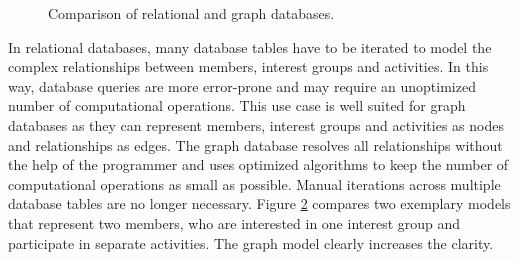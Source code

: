 \documentclass[12pt,numbers=noenddot,parskip,bibliography=totocnumbered,listof=totocnumbered,draft]{scrreprt}
\begin{document}
\begin{figure}
\bigskip

\begin{subfigure}[b]{\textwidth}%
\centering
{}
\caption{}
\label{graph database}
\end{subfigure}%
\caption[Comparison of relational and graph databases]{Comparison of relational and graph databases.}
\label{databases}
\end{figure}

In relational databases, many database tables have to be iterated to model the complex relationships between members, interest groups and activities. In this way, database queries are more error-prone and may require an unoptimized number of computational operations.
This use case is well suited for graph databases as they can represent members, interest groups and activities as nodes and relationships as edges. The graph database resolves all relationships without the help of the programmer and uses optimized algorithms to keep the number of computational operations as small as possible. Manual iterations across multiple database tables are no longer necessary. Figure \ref{databases} compares two exemplary models that represent two members, who are interested in one interest group and participate in separate activities. The graph model clearly increases the clarity.
\end{document}
